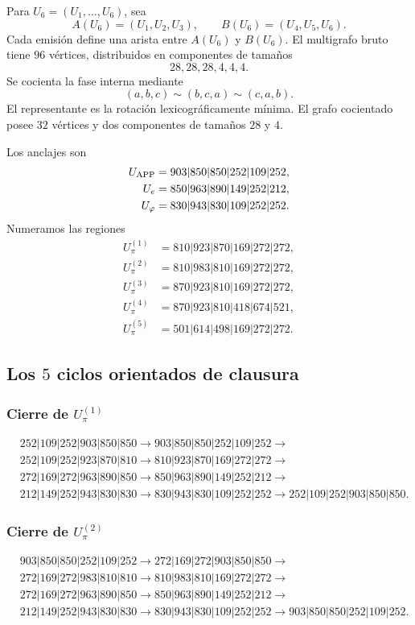 Para \(U_6=(U_1,\ldots,U_6)\), sea
\[
 A(U_6)=(U_1,U_2,U_3),
 \qquad
 B(U_6)=(U_4,U_5,U_6).
\]
Cada emisión define una arista entre \(A(U_6)\) y \(B(U_6)\). El multigrafo
bruto tiene \(96\) vértices, distribuidos en componentes de tamaños
\[
 28,28,28,4,4,4.
\]
Se cocienta la fase interna mediante
\[
 (a,b,c)\sim(b,c,a)\sim(c,a,b).
\]
El representante es la rotación lexicográficamente mínima. El grafo
cocientado posee \(32\) vértices y dos componentes de tamaños \(28\) y \(4\).

Los anclajes son
\[
\begin{aligned}
U_{\rm APP}&=903|850|850|252|109|252,\\
U_e&=850|963|890|149|252|212,\\
U_\varphi&=830|943|830|109|252|252.
\end{aligned}
\]
Numeramos las regiones
\[
\begin{aligned}
U_\pi^{(1)}&=810|923|870|169|272|272,\\
U_\pi^{(2)}&=810|983|810|169|272|272,\\
U_\pi^{(3)}&=870|923|810|169|272|272,\\
U_\pi^{(4)}&=870|923|810|418|674|521,\\
U_\pi^{(5)}&=501|614|498|169|272|272.
\end{aligned}
\]

\subsection{Los \(5\) ciclos orientados de clausura}

\subsubsection{Cierre de \texorpdfstring{\(U_\pi^{(1)}\)}{U-pi 1}}
\begin{align*}
&252|109|252|903|850|850\to
903|850|850|252|109|252\to\\
&252|109|252|923|870|810\to
810|923|870|169|272|272\to\\
&272|169|272|963|890|850\to
850|963|890|149|252|212\to\\
&212|149|252|943|830|830\to
830|943|830|109|252|252\to
252|109|252|903|850|850.
\end{align*}

\subsubsection{Cierre de \texorpdfstring{\(U_\pi^{(2)}\)}{U-pi 2}}
\begin{align*}
&903|850|850|252|109|252\to
272|169|272|903|850|850\to\\
&272|169|272|983|810|810\to
810|983|810|169|272|272\to\\
&272|169|272|963|890|850\to
850|963|890|149|252|212\to\\
&212|149|252|943|830|830\to
830|943|830|109|252|252\to
903|850|850|252|109|252.
\end{align*}

